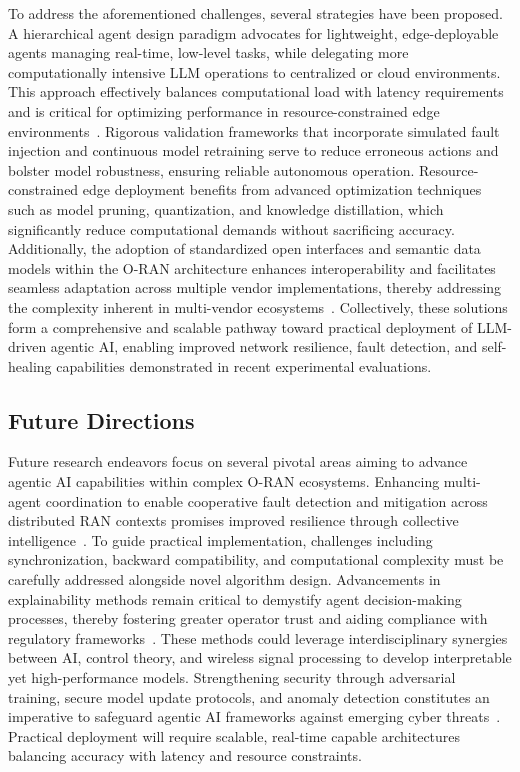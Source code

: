 \documentclass[sigconf]{acmart}
\begin{document}
To address the aforementioned challenges, several strategies have been proposed. A hierarchical agent design paradigm advocates for lightweight, edge-deployable agents managing real-time, low-level tasks, while delegating more computationally intensive LLM operations to centralized or cloud environments. This approach effectively balances computational load with latency requirements and is critical for optimizing performance in resource-constrained edge environments~\cite{ref55}. Rigorous validation frameworks that incorporate simulated fault injection and continuous model retraining serve to reduce erroneous actions and bolster model robustness, ensuring reliable autonomous operation. Resource-constrained edge deployment benefits from advanced optimization techniques such as model pruning, quantization, and knowledge distillation, which significantly reduce computational demands without sacrificing accuracy. Additionally, the adoption of standardized open interfaces and semantic data models within the O-RAN architecture enhances interoperability and facilitates seamless adaptation across multiple vendor implementations, thereby addressing the complexity inherent in multi-vendor ecosystems~\cite{ref55}. Collectively, these solutions form a comprehensive and scalable pathway toward practical deployment of LLM-driven agentic AI, enabling improved network resilience, fault detection, and self-healing capabilities demonstrated in recent experimental evaluations.

\subsection{Future Directions}

Future research endeavors focus on several pivotal areas aiming to advance agentic AI capabilities within complex O-RAN ecosystems. Enhancing multi-agent coordination to enable cooperative fault detection and mitigation across distributed RAN contexts promises improved resilience through collective intelligence~\cite{ref21}. To guide practical implementation, challenges including synchronization, backward compatibility, and computational complexity must be carefully addressed alongside novel algorithm design. Advancements in explainability methods remain critical to demystify agent decision-making processes, thereby fostering greater operator trust and aiding compliance with regulatory frameworks~\cite{ref48}. These methods could leverage interdisciplinary synergies between AI, control theory, and wireless signal processing to develop interpretable yet high-performance models. Strengthening security through adversarial training, secure model update protocols, and anomaly detection constitutes an imperative to safeguard agentic AI frameworks against emerging cyber threats~\cite{ref50}. Practical deployment will require scalable, real-time capable architectures balancing accuracy with latency and resource constraints.
\end{document}
